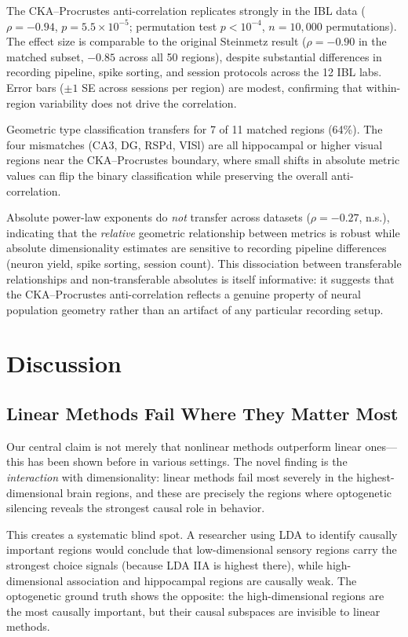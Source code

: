 \documentclass{article}
\begin{document}
The CKA--Procrustes anti-correlation replicates strongly in the IBL data ($\rho = -0.94$, $p = 5.5 \times 10^{-5}$; permutation test $p < 10^{-4}$, $n = 10{,}000$ permutations). The effect size is comparable to the original Steinmetz result ($\rho = -0.90$ in the matched subset, $-0.85$ across all 50 regions), despite substantial differences in recording pipeline, spike sorting, and session protocols across the 12 IBL labs. Error bars ($\pm 1$ SE across sessions per region) are modest, confirming that within-region variability does not drive the correlation.

Geometric type classification transfers for 7 of 11 matched regions (64\%). The four mismatches (CA3, DG, RSPd, VISl) are all hippocampal or higher visual regions near the CKA--Procrustes boundary, where small shifts in absolute metric values can flip the binary classification while preserving the overall anti-correlation.

Absolute power-law exponents do \emph{not} transfer across datasets ($\rho = -0.27$, n.s.), indicating that the \emph{relative} geometric relationship between metrics is robust while absolute dimensionality estimates are sensitive to recording pipeline differences (neuron yield, spike sorting, session count). This dissociation between transferable relationships and non-transferable absolutes is itself informative: it suggests that the CKA--Procrustes anti-correlation reflects a genuine property of neural population geometry rather than an artifact of any particular recording setup.

\section{Discussion}

\subsection{Linear Methods Fail Where They Matter Most}

Our central claim is not merely that nonlinear methods outperform linear ones---this has been shown before in various settings. The novel finding is the \emph{interaction} with dimensionality: linear methods fail most severely in the highest-dimensional brain regions, and these are precisely the regions where optogenetic silencing reveals the strongest causal role in behavior.

This creates a systematic blind spot. A researcher using LDA to identify causally important regions would conclude that low-dimensional sensory regions carry the strongest choice signals (because LDA IIA is highest there), while high-dimensional association and hippocampal regions are causally weak. The optogenetic ground truth shows the opposite: the high-dimensional regions are the most causally important, but their causal subspaces are invisible to linear methods.
\end{document}
